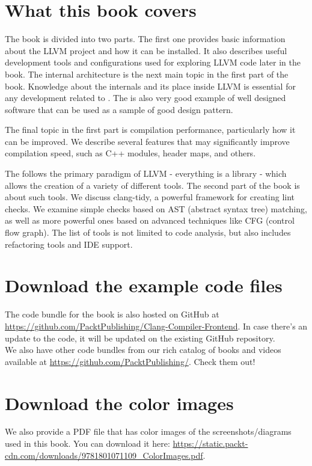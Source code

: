 \begin{FlushLeft}
\section*{What this book covers}
The book is divided into two parts. The first one provides basic information
about the LLVM project and how it can be installed. It also describes useful
development tools and configurations used for exploring LLVM code later in the
book. The internal \clang architecture is the next main topic in the first part
of the book. Knowledge about the \clang internals and its place inside LLVM is
essential for any development related to \clang. The \clang is also very good
example of well designed software that can be used as a sample of good design
pattern.

The final topic in the first
part is compilation performance, particularly how it can be improved. We
describe several \clang features that may significantly improve compilation
speed, such as C++ modules, header maps, and others. 

The \clang follows the primary paradigm of LLVM - everything is a library -
which allows the creation of a variety of different tools. The second part of
the book is about such tools. We discuss clang-tidy, a powerful framework for
creating lint checks. We examine simple checks based on AST (abstract syntax
tree) matching, as well as more powerful ones based on advanced techniques like
CFG (control flow graph). The list of tools is not limited to code analysis, but
also includes refactoring tools and IDE support. 

\section*{Download the example code files}
The code bundle for the book is also hosted on GitHub at \url{https://github.com/PacktPublishing/Clang-Compiler-Frontend}. In case there's an
update to the code, it will be updated on the existing GitHub repository.\\


We also have other code bundles from our rich catalog of books and videos available at \url{https://github.com/PacktPublishing/}. Check them out!

\section*{Download the color images}
We also provide a PDF file that has color images of the screenshots/diagrams used in this book. You can download it here: \url{https://static.packt-cdn.com/downloads/9781801071109_ColorImages.pdf}.


\end{FlushLeft}
